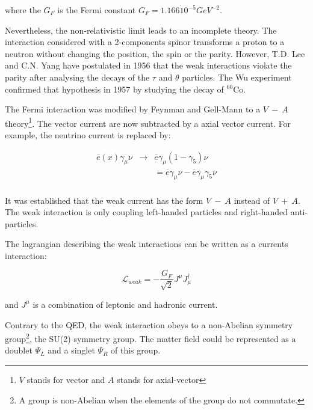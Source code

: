     where the $G_F$ is the Fermi constant $G_F = 1.166 \dot 10^{-5} GeV^{-2}$. 
    
    Nevertheless, the non-relativistic limit leads to an incomplete theory.
    The interaction considered with a 2-components spinor transforms a proton to a neutron without changing the position, the spin or the parity.
    However, T.D. Lee and C.N. Yang have postulated in 1956 that the weak interactions violate the parity after analysing the decays of the $\tau$ and $\theta$ particles.\cite{1956PhRv..104..254L}
    The Wu experiment \cite{1957PhRv..105.1413W} confirmed that hypothesis in 1957 by studying the decay of $^{60}$Co.

    The Fermi interaction was modified by Feynman and Gell-Mann\cite{PhysRev.109.193} to a $V \ - \ A$ theory\footnote{$V$ stands for vector and $A$ stands for axial-vector}.
    The vector current are now subtracted by a axial vector current. For example, the neutrino current is replaced by:

    \begin{equation}
        \begin{array}{rrl}
        \overline{e}(x) \gamma_{\mu} \nu & \rightarrow & \overline{e}\gamma_{\mu}(1 - \gamma_5 ) \nu \\
            & & = \overline{e} \gamma_{\mu} \nu - \overline{e}\gamma_{\mu} \gamma_5 \nu \\
        \end{array}
    \end{equation}

    It was established that the weak current has the form $V \ - \ A$ instead of $V \ + \ A$.
    The weak interaction is only coupling left-handed particles and right-handed anti-particles.
    
    The lagrangian describing the weak interactions can be written as a currents interaction:

    \begin{equation}
      \mathcal{L}_{weak} = - \frac{G_F}{\sqrt{2}} J^{\mu}J_{\mu}^{\dagger}
    \end{equation}
    
     and $J^{\mu}$ is a combination of leptonic and hadronic current.

    Contrary to the QED, the weak interaction obeys to a non-Abelian symmetry group\footnote{A group is non-Abelian when the elements of the group do not commutate.}, the SU(2) symmetry group.
    The matter field could be represented as a doublet $\Psi_L$ and a singlet $\Psi_R$ of this group.

